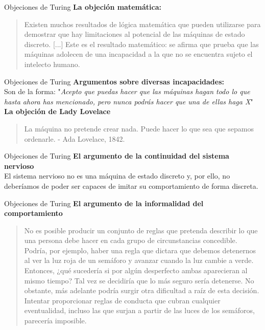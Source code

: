 \documentclass{beamer}
\begin{document}
\begin{frame}{Objeciones de Turing}
\textbf{La objeción matemática:}
\begin{quote}\small Existen muchos resultados de lógica matemática que pueden utilizarse para demostrar que hay limitaciones al potencial de las máquinas de estado discreto. [...] Este es el resultado matemático: se afirma que prueba que las máquinas adolecen de una incapacidad a la que no se encuentra sujeto el intelecto humano.\end{quote}
\end{frame}

\begin{frame}{Objeciones de Turing}
\textbf{Argumentos sobre diversas incapacidades:}\\
Son de la forma: "\emph{Acepto que puedas hacer que las máquinas hagan todo lo que hasta ahora has mencionado, pero nunca podrás hacer que una de ellas haga X}"\\
\vspace{8mm}
\textbf{La objeción de Lady Lovelace}
\begin{quote}\small La máquina no pretende crear nada. Puede hacer lo que sea que sepamos ordenarle. - Ada Lovelace, 1842.\end{quote}
\end{frame}

\begin{frame}{Objeciones de Turing}
\textbf{El argumento de la continuidad del sistema nervioso}\\
El sistema nervioso no es una máquina de estado discreto y, por ello, no deberíamos de poder ser capaces de imitar su comportamiento de forma discreta.

\end{frame}

\begin{frame}{Objeciones de Turing}
\textbf{El argumento de la informalidad del comportamiento}
\begin{quote}\small No es posible producir un conjunto de reglas que pretenda describir lo que una persona debe hacer en cada grupo de circunstancias concedible. Podría, por ejemplo, haber una regla que dictara que debemos detenernos al ver la luz roja de un semáforo y avanzar cuando la luz cambie a verde. Entonces, ¿qué sucedería si por algún desperfecto ambas aparecieran al mismo tiempo? Tal vez se decidiría que lo más seguro sería detenerse. No obstante, más adelante podría surgir otra dificultad a raíz de esta decisión. Intentar proporcionar reglas de conducta que cubran cualquier eventualidad, incluso las que surjan a partir de las luces de los semáforos, parecería imposible.
\end{quote}
\end{frame}
\end{document}
